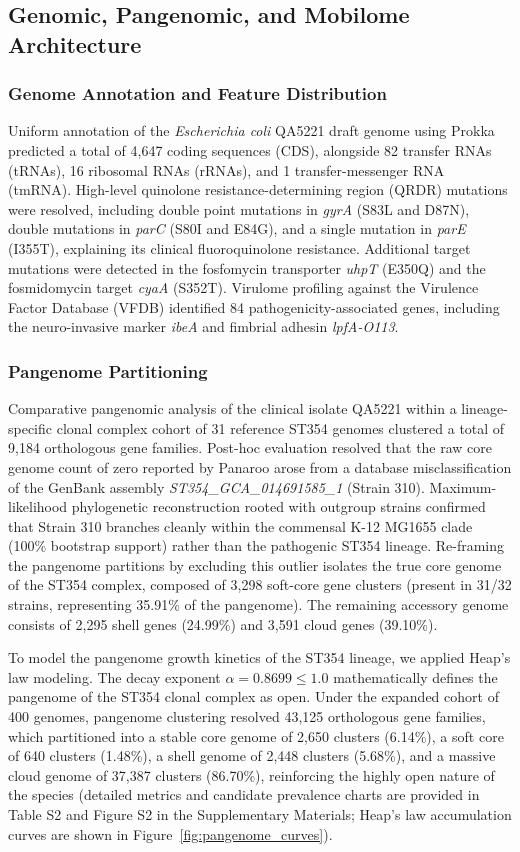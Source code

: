 \documentclass[pdflatex,sn-mathphys-num]{sn-jnl}
\begin{document}
\subsection{Genomic, Pangenomic, and Mobilome Architecture}
\subsubsection{Genome Annotation and Feature Distribution}
Uniform annotation of the \textit{Escherichia coli} QA5221 draft genome using Prokka predicted a total of 4,647 coding sequences (CDS), alongside 82 transfer RNAs (tRNAs), 16 ribosomal RNAs (rRNAs), and 1 transfer-messenger RNA (tmRNA). High-level quinolone resistance-determining region (QRDR) mutations were resolved, including double point mutations in \textit{gyrA} (S83L and D87N), double mutations in \textit{parC} (S80I and E84G), and a single mutation in \textit{parE} (I355T), explaining its clinical fluoroquinolone resistance. Additional target mutations were detected in the fosfomycin transporter \textit{uhpT} (E350Q) and the fosmidomycin target \textit{cyaA} (S352T). Virulome profiling against the Virulence Factor Database (VFDB) identified 84 pathogenicity-associated genes, including the neuro-invasive marker \textit{ibeA} and fimbrial adhesin \textit{lpfA-O113}.

\subsubsection{Pangenome Partitioning}
Comparative pangenomic analysis of the clinical isolate QA5221 within a lineage-specific clonal complex cohort of 31 reference ST354 genomes clustered a total of 9,184 orthologous gene families. Post-hoc evaluation resolved that the raw core genome count of zero reported by Panaroo arose from a database misclassification of the GenBank assembly \textit{ST354\_GCA\_014691585\_1} (Strain 310). Maximum-likelihood phylogenetic reconstruction rooted with outgroup strains confirmed that Strain 310 branches cleanly within the commensal K-12 MG1655 clade (100\% bootstrap support) rather than the pathogenic ST354 lineage. Re-framing the pangenome partitions by excluding this outlier isolates the true core genome of the ST354 complex, composed of 3,298 soft-core gene clusters (present in 31/32 strains, representing 35.91\% of the pangenome). The remaining accessory genome consists of 2,295 shell genes (24.99\%) and 3,591 cloud genes (39.10\%).

To model the pangenome growth kinetics of the ST354 lineage, we applied Heap's law modeling. The decay exponent $\alpha = 0.8699 \le 1.0$ mathematically defines the pangenome of the ST354 clonal complex as open. Under the expanded cohort of 400 genomes, pangenome clustering resolved 43,125 orthologous gene families, which partitioned into a stable core genome of 2,650 clusters (6.14\%), a soft core of 640 clusters (1.48\%), a shell genome of 2,448 clusters (5.68\%), and a massive cloud genome of 37,387 clusters (86.70\%), reinforcing the highly open nature of the species (detailed metrics and candidate prevalence charts are provided in Table S2 and Figure S2 in the Supplementary Materials; Heap's law accumulation curves are shown in Figure~\ref{fig:pangenome_curves}).
\end{document}
